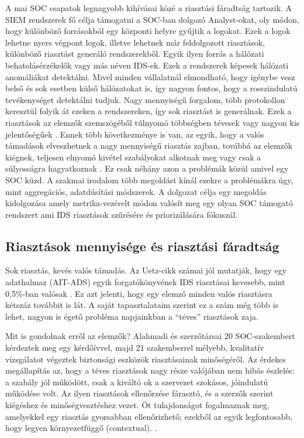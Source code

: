 A mai \ac{SOC} csapatok legnagyobb kihívásai közé a riasztási fáradtság tartozik. A \ac{SIEM} rendszerek fő célja támogatni a \ac{SOC}-ban dolgozó Analyst-okat, oly módon, hogy különböző forrásokból egy központi helyre gyűjtik a logokat. Ezek a logok lehetne nyers végpont logok, illetve lehetnek már feldolgozott riasztások, különböző riasztást generáló rendszerekből. Egyik ilyen forrás a hálózati behatolásérzékelők vagy más néven \ac{IDS}-ek. Ezek a rendszerek képesek hálózati anomáliákat detektálni. Mivel minden vállalatnál elmondható, hogy igénybe vesz belső és sok esetben külső hálózatokat is, így nagyon fontos, hogy a rosszindulatú tevékenységet detektálni tudjuk. Nagy mennyiségű forgalom, több protokollon keresztül folyik át ezeken a rendszereken, így sok riasztást is generálnak. Ezek a riasztások az elemzők szemszögéből túlnyomó többségben tévesek vagy nagyon kis jelentőségűek \cite{alahmadi2022}. Ennek több következménye is van, az egyik, hogy a valós támadások elveszhetnek a nagy mennyiségű riasztás zajban, továbbá az elemzők kiégnek, teljesen elnyomó kivétel szabályokat alkotnak meg vagy csak a súlyosságra hagyatkoznak \cite{ndichu2026}. Ez csak néhány azon a problémák közül amivel egy \ac{SOC} küzd. A szakmai irodalom több megoldást kínál ezekre a problémákra úgy, mint aggregációs, adatdúsítási módszerek. A dolgozat célja egy megoldás kidolgozása amely metrika-vezérelt módon valósít meg egy olyan \ac{SOC} támogató rendszert ami \ac{IDS} riasztások szűrésére és priorizálására fókuszál.

\subsection{Riasztások mennyisége és riasztási fáradtság}\label{sec:problema}
Sok riasztás, kevés valós támadás. Az Uetz-cikk számai jól mutatják, hogy egy adathalmaz (AIT-ADS) egyik forgatókönyvének \ac{IDS} riasztásai kevesebb, mint 0,5\%-ban valósak \cite{uetz2026rba}. Ez azt jelenti, hogy egy elemző minden valós riasztásra kétszáz továbbit is lát. A saját tapasztalataim szerint ez a szám még több is lehet, nagyon is égető probléma napjainkban a \enquote{téves} riasztások zaja. 

Mit is gondolnak erről az elemzők? Alahmadi és szerzőtársai 20 \ac{SOC}-szakembert kérdeztek meg egy kérdőívvel, majd 21 szakemberrel mélyebb, kvalitatív vizsgálatot végeztek biztonsági eszközök riasztásainak minőségéről. Az érdekes megállapítás az, hogy a téves riasztások nagy része valójában nem hibás észlelés: a szabály jól működött, csak a kiváltó ok a szervezet szokásos, jóindulatú működése volt. Az ilyen riasztások ellenőrzése fárasztó, és a szerzők szerint kiégéshez és minőségvesztéshez vezet. Öt tulajdonságot fogalmaznak meg, amelyekkel egy riasztás gyorsabban ellenőrizhető; ezekből az egyik legfontosabb, hogy legyen környezetfüggő (contextual). \cite{alahmadi2022}.

